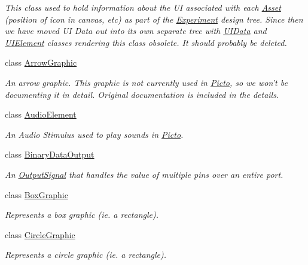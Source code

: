\begin{DoxyCompactItemize}
\begin{DoxyCompactList}\small\item\em This class used to hold information about the U\-I associated with each \hyperlink{class_picto_1_1_asset}{Asset} (position of icon in canvas, etc) as part of the \hyperlink{class_picto_1_1_experiment}{Experiment} design tree. Since then we have moved U\-I Data out into its own separate tree with \hyperlink{class_picto_1_1_u_i_data}{U\-I\-Data} and \hyperlink{class_picto_1_1_u_i_element}{U\-I\-Element} classes rendering this class obsolete. It should probably be deleted. \end{DoxyCompactList}\item 
class \hyperlink{class_picto_1_1_arrow_graphic}{Arrow\-Graphic}
\begin{DoxyCompactList}\small\item\em An arrow graphic. This graphic is not currently used in \hyperlink{namespace_picto}{Picto}, so we won't be documenting it in detail. Original documentation is included in the details. \end{DoxyCompactList}\item 
class \hyperlink{class_picto_1_1_audio_element}{Audio\-Element}
\begin{DoxyCompactList}\small\item\em An Audio Stimulus used to play sounds in \hyperlink{namespace_picto}{Picto}. \end{DoxyCompactList}\item 
class \hyperlink{class_picto_1_1_binary_data_output}{Binary\-Data\-Output}
\begin{DoxyCompactList}\small\item\em An \hyperlink{struct_picto_1_1_output_signal}{Output\-Signal} that handles the value of multiple pins over an entire port. \end{DoxyCompactList}\item 
class \hyperlink{class_picto_1_1_box_graphic}{Box\-Graphic}
\begin{DoxyCompactList}\small\item\em Represents a box graphic (ie. a rectangle). \end{DoxyCompactList}\item 
class \hyperlink{class_picto_1_1_circle_graphic}{Circle\-Graphic}
\begin{DoxyCompactList}\small\item\em Represents a circle graphic (ie. a rectangle). \end{DoxyCompactList}\item 

\end{DoxyCompactItemize}
